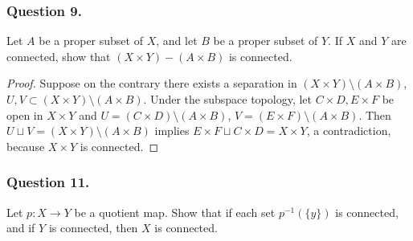 \documentclass[12pt]{article}
\begin{document}
\subsubsection*{Question 9.} Let \( A \) be a proper subset of \( X \), and let \( B \) 
be a proper subset of \( Y \). If \( X \) and \( Y \) are connected, 
show that \( (X \times Y) - (A \times B) \) is connected.
\begin{proof}
    Suppose on the contrary there exists a 
    separation in $(X \times Y) \setminus (A \times B)$, $U, V \subset (X \times Y) \setminus (A \times B)$.
    Under the subspace topology, let $C \times D, E \times F$ be open in $X \times Y$ and 
    $U = (C \times D) \setminus (A \times B)$, $V = (E \times F) \setminus (A \times B)$.
    Then $U \sqcup V = (X \times Y) \setminus (A \times B)$ implies $E \times F \sqcup C \times D = X \times Y$,
    a contradiction, because $X \times Y$ is connected.

\end{proof}



\subsubsection*{Question 11.} Let \( p : X \to Y \) be a quotient map. 
Show that if each set \( p^{-1}(\{y\}) \) is connected, and 
if \( Y \) is connected, then \( X \) is connected.
\end{document}
